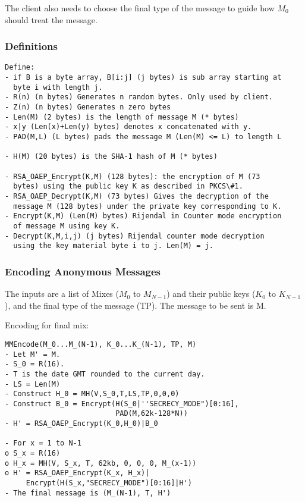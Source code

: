 \documentclass{article}
\begin{document}
The client also needs to choose the final type of the message to guide
how $M_0$ should treat the message.

\subsubsection{Definitions}

\begin{verbatim}
Define:
- if B is a byte array, B[i:j] (j bytes) is sub array starting at 
  byte i with length j.
- R(n) (n bytes) Generates n random bytes. Only used by client.
- Z(n) (n bytes) Generates n zero bytes
- Len(M) (2 bytes) is the length of message M (* bytes)
- x|y (Len(x)+Len(y) bytes) denotes x concatenated with y.
- PAD(M,L) (L bytes) pads the message M (Len(M) <= L) to length L

- H(M) (20 bytes) is the SHA-1 hash of M (* bytes)

- RSA_OAEP_Encrypt(K,M) (128 bytes): the encryption of M (73
  bytes) using the public key K as described in PKCS\#1.
- RSA_OAEP_Decrypt(K,M) (73 bytes) Gives the decryption of the
  message M (128 bytes) under the private key corresponding to K.
- Encrypt(K,M) (Len(M) bytes) Rijendal in Counter mode encryption 
  of message M using key K. 
- Decrypt(K,M,i,j) (j bytes) Rijendal counter mode decryption 
  using the key material byte i to j. Len(M) = j.
\end{verbatim}

\subsubsection{Encoding Anonymous Messages}

The inputs are a list of Mixes ($M_0$ to $M_{N-1}$) and their public
keys ($K_0$ to $K_{N-1}$), and the final type of the message (TP). The
message to be sent is M.

Encoding for final mix: 

\begin{verbatim}
MMEncode(M_0...M_(N-1), K_0...K_(N-1), TP, M)
- Let M' = M.
- S_0 = R(16).
- T is the date GMT rounded to the current day.
- LS = Len(M)
- Construct H_0 = MH(V,S_0,T,LS,TP,0,0,0)
- Construct B_0 = Encrypt(H(S_0|''SECRECY_MODE")[0:16],
                          PAD(M,62k-128*N))
- H' = RSA_OAEP_Encrypt(K_0,H_0)|B_0

- For x = 1 to N-1
o S_x = R(16)
o H_x = MH(V, S_x, T, 62kb, 0, 0, 0, M_(x-1))
o H' = RSA_OAEP_Encrypt(K_x, H_x)|
     Encrypt(H(S_x,"SECRECY_MODE")[0:16]|H')
- The final message is (M_(N-1), T, H')
\end{verbatim}
\end{document}
